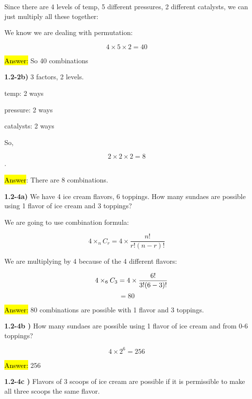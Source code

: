 \documentclass{article}
\begin{document}
Since there are 4 levels of temp, 5 different pressures, 2 different catalysts, we can just multiply all these together:
\vspace{4mm}

We know we are dealing with permutation:
\vspace{4mm}


$${4}\times {5}\times {2}=40$$

\hl{Answer:} So 40 combinations

\vspace{5mm}

\textbf{1.2-2b)} 3 factors, 2 levels.

temp: 2 ways

pressure: 2 ways 


catalysts: 2 ways

So,

 $$2\times2\times2=8$$. 
 
 \hl{Answer}: There are 8 combinations.




\newpage

\textbf{1.2-4a)} We have 4 ice cream flavors, 6 toppings. How many sundaes are possible using 1 flavor of ice cream and 3 toppings?
\vspace{2mm}

We are going to use combination formula: 

$$4\times_{n}C_{r}=4\times \frac{n!}{r!(n-r)!}$$

\vspace{2mm}
We are multiplying by 4 because of the 4 different flavors:

$$\hspace{.2in}4\times_{6}C_{3}=4\times \frac{6!}{3!(6-3)!}$$
$$=80$$

\hl{Answer:} 80 combinations are possible with 1 flavor and 3 toppings.

\vspace{2mm}
\textbf{1.2-4b )} How many sundaes are possible using 1 flavor of ice cream and from 0-6 toppings?

$$4\times 2^{6}=256$$

\hl{Answer:} 256

\vspace{3mm}

\textbf{1.2-4c )} Flavors of 3 scoops of ice cream are possible if it is permissible to make all three scoops the same flavor.
\end{document}
